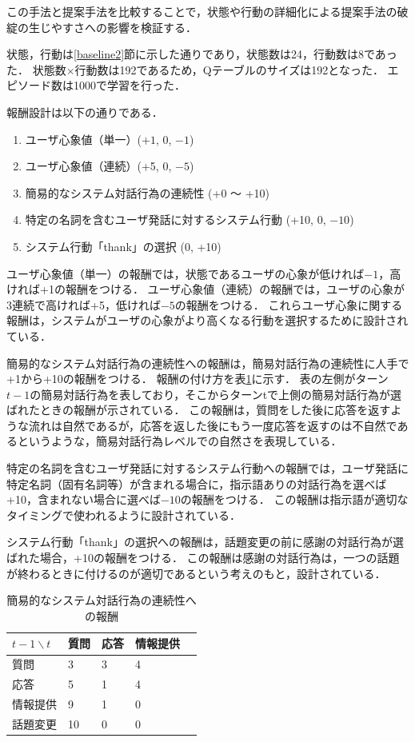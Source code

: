 \documentclass[12pt,a4paper,twoside,openany]{jbook}
\begin{document}
この手法と提案手法を比較することで，状態や行動の詳細化による提案手法の破綻の生じやすさへの影響を検証する．

状態，行動は\ref{baseline2}節に示した通りであり，状態数は24，行動数は8であった．
状態数$\times$行動数は192であるため，Qテーブルのサイズは192となった．
エピソード数は1000で学習を行った．

報酬設計は以下の通りである．
\begin{enumerate}
    \item ユーザ心象値（単一）($+1$, $0$, $-1$)
    \item ユーザ心象値（連続）(+5, 0, $-5$)
    \item 簡易的なシステム対話行為の連続性 (+0 ～ +10)
    \item 特定の名詞を含むユーザ発話に対するシステム行動 (+10, 0, $-10$)
    \item システム行動「thank」の選択 (0, +10)
\end{enumerate}



ユーザ心象値（単一）の報酬では，状態であるユーザの心象が低ければ$-1$，高ければ+1の報酬をつける．
ユーザ心象値（連続）の報酬では，ユーザの心象が3連続で高ければ+5，低ければ$-5$の報酬をつける．
これらユーザ心象に関する報酬は，システムがユーザの心象がより高くなる行動を選択するために設計されている．

簡易的なシステム対話行為の連続性への報酬は，簡易対話行為の連続性に人手で+1から+10の報酬をつける．
報酬の付け方を表\ref{hosyu3}に示す．
表の左側がターン$t-1$の簡易対話行為を表しており，そこからターンtで上側の簡易対話行為が選ばれたときの報酬が示されている．
この報酬は，質問をした後に応答を返すような流れは自然であるが，応答を返した後にもう一度応答を返すのは不自然であるというような，簡易対話行為レベルでの自然さを表現している．

特定の名詞を含むユーザ発話に対するシステム行動への報酬では，ユーザ発話に特定名詞（固有名詞等）が含まれる場合に，指示語ありの対話行為を選べば+10，含まれない場合に選べば$-10$の報酬をつける．
この報酬は指示語が適切なタイミングで使われるように設計されている．

システム行動「thank」の選択への報酬は，話題変更の前に感謝の対話行為が選ばれた場合，+10の報酬をつける．
この報酬は感謝の対話行為は，一つの話題が終わるときに付けるのが適切であるという考えのもと，設計されている．


\begin{table}[tb]
    \caption{簡易的なシステム対話行為の連続性への報酬}\label{hosyu3}
    \centering
    \begin{tabular}{|l|l|l|l|l|}\hline 
         $t-1\backslash t$&質問&応答&情報提供 \\ \hline 
         質問&3&3&4 \\ \hline
         応答&5&1&4 \\ \hline
         情報提供&9&1&0 \\ \hline
         話題変更&10&0&0 \\ \hline
    \end{tabular}
\end{table}
\end{document}
